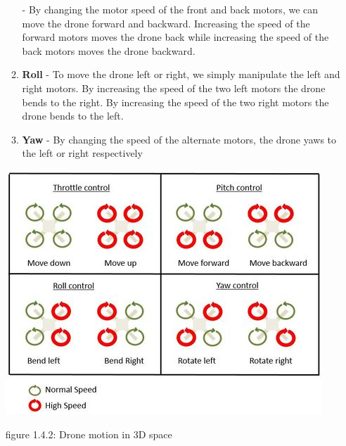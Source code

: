 \documentclass[a4paper,12pt,oneside]{book}
\begin{document}
\begin{itemize}
\begin{enumerate}[I]
            - By changing the motor speed of the front and back motors, we can move the drone forward and backward. Increasing the speed of the forward motors moves the drone back while increasing the speed of the back motors moves the drone backward.
            \item\textbf{ Roll} 
            - To move the drone left or right, we simply manipulate the left and right motors. By increasing the speed of the two left motors the drone bends to the right. By increasing the speed of the two right motors the drone bends to the left.
            \item\textbf{ Yaw} - By changing the speed of the alternate motors, the drone yaws to the left or right respectively
        \end{enumerate}
        \begin{center}
         \includegraphics{roll.png}
        \end{center}
       \begin{center}
         figure 1.4.2:  Drone motion in 3D space
       \end{center}
        
    \end{itemize}
 
\end{document}
